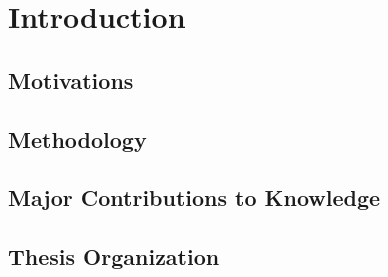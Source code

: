 \chapter{Introduction} \label{introduction}


\section{Motivations} \label{motivations}
\section{Methodology} \label{methodology}
\section{Major Contributions to Knowledge} \label{contribution-to-know}
\section{Thesis Organization} \label{thesis-org}




